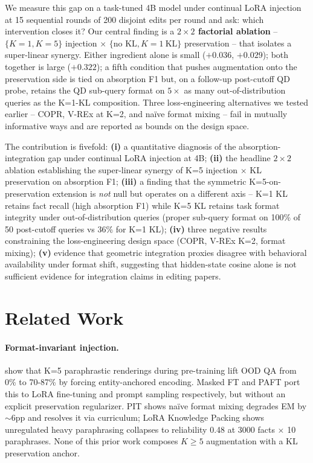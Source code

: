 \documentclass[11pt]{article}
\begin{document}
We measure this gap on a task-tuned 4B model under continual LoRA injection
at 15 sequential rounds of 200 disjoint edits per round and ask: which
intervention closes it? Our central finding is a \textbf{$2 \times 2$
factorial ablation} -- $\{K=1, K=5\}$ injection $\times$ $\{\text{no KL},
K=1\ \text{KL}\}$ preservation -- that isolates a super-linear synergy.
Either ingredient alone is small ($+0.036$, $+0.029$); both together is
large ($+0.322$); a fifth condition that pushes augmentation onto the
preservation side is tied on absorption F1 but, on a follow-up post-cutoff
QD probe, retains the QD sub-query format on $5\times$ as many
out-of-distribution queries as the K=1-KL composition. Three
loss-engineering alternatives we tested earlier -- COPR, V-REx at K=2,
and na\"ive format mixing -- fail in mutually informative ways and are
reported as bounds on the design space.

The contribution is fivefold:
\textbf{(i)} a quantitative diagnosis of the absorption-integration gap
under continual LoRA injection at 4B;
\textbf{(ii)} the headline $2 \times 2$ ablation establishing the
super-linear synergy of K=5 injection $\times$ KL preservation on
absorption F1;
\textbf{(iii)} a finding that the symmetric K=5-on-preservation
extension is \emph{not} null but operates on a different axis -- K=1 KL
retains fact recall (high absorption F1) while K=5 KL retains task
format integrity under out-of-distribution queries (proper sub-query
format on 100\% of 50 post-cutoff queries vs 36\% for K=1 KL);
\textbf{(iv)} three negative results constraining the loss-engineering
design space (COPR, V-REx K=2, format mixing);
\textbf{(v)} evidence that geometric integration proxies disagree with
behavioral availability under format shift, suggesting that hidden-state
cosine alone is not sufficient evidence for integration claims in editing
papers.

\section{Related Work}

\paragraph{Format-invariant injection.}
\citet{allenzhu2023knowledge} show that K=5 paraphrastic renderings during
pre-training lift OOD QA from 0\% to 70-87\% by forcing entity-anchored
encoding. Masked FT \citep{pan2025maskedft} and PAFT \citep{wei2025paft}
port this to LoRA fine-tuning and prompt sampling respectively, but without
an explicit preservation regularizer. PIT \citep{jiang2024pit} shows
na\"ive format mixing degrades EM by $\sim$6pp and resolves it via
curriculum; LoRA Knowledge Packing \citep{pletenev2025lora} shows
unregulated heavy paraphrasing collapses to reliability 0.48 at 3000 facts
$\times$ 10 paraphrases. None of this prior work composes $K \geq 5$
augmentation with a KL preservation anchor.
\end{document}
